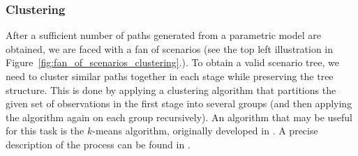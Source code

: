 
\subsubsection{Clustering}
After a sufficient number of paths generated from a parametric model are obtained, we are faced with a fan of scenarios (see the top left illustration in Figure~\ref{fig:fan_of_scenarios_clustering}.). To obtain a valid scenario tree, we need to cluster similar paths together in each stage while preserving the tree structure. This is done by applying a clustering algorithm that partitions the given set of observations in the first stage into several groups (and then applying the algorithm again on each group recursively). An algorithm that may be useful for this task is the $k$-means algorithm, originally developed in \cite{kmeans}. A precise description of the process can be found in \cite[Section 3]{kmeans_clustering}.

